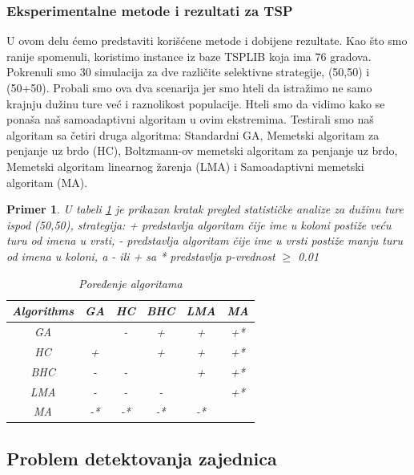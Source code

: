 \documentclass[a4paper]{article}
\newtheorem{primer}{Primer}[section]
\begin{document}
\subsubsection{Eksperimentalne metode i rezultati za TSP}
\label{sec:rez}

U ovom delu ćemo predstaviti korišćene metode i dobijene rezultate. 
Kao što smo ranije spomenuli, koristimo instance iz baze TSPLIB \cite{TSPLIB} koja ima 76 gradova. Pokrenuli smo 30 simulacija za dve različite selektivne strategije, (50,50) i (50+50). Probali smo ova dva scenarija jer smo hteli da istražimo ne samo krajnju dužinu ture već i raznolikost populacije. Hteli smo da vidimo kako se ponaša naš samoadaptivni algoritam u ovim ekstremima. Testirali smo naš algoritam sa četiri druga algoritma: Standardni GA, Memetski algoritam za penjanje uz brdo (HC), Boltzmann-ov memetski algoritam za penjanje uz brdo, Memetski algoritam linearnog žarenja (LMA) i Samoadaptivni memetski algoritam (MA).


\begin{primer}U tabeli \ref{tab:tabela2} je prikazan kratak pregled statističke analize za dužinu ture ispod (50,50), strategija: + predstavlja algoritam čije ime u koloni postiže veću turu od imena u vrsti, - predstavlja algoritam čije ime u vrsti postiže manju turu od imena u koloni, a - ili + sa * predstavlja p-vrednost $\geq$ 0.01


\begin{table}[h!]
\begin{center}
\caption{Poređenje algoritama}
\begin{tabular}{||c|c|c|c|c|c||} \hline
Algorithms & GA& HC& BHC& LMA& MA\\ \hline
GA &  & - & + & + & +* \\ \hline
HC & + &  & + & + & +* \\ \hline
BHC & - & - &  & + & +* \\ \hline
LMA & - & - & - &  & +* \\ \hline
MA & -* & -* & -* & -* & \\ \hline
\end{tabular}
\label{tab:tabela2}
\end{center}
\end{table}

\end{primer}


\subsection{Problem detektovanja zajednica}
\label{sec:prepoznavanje_zajednica}
\end{document}

